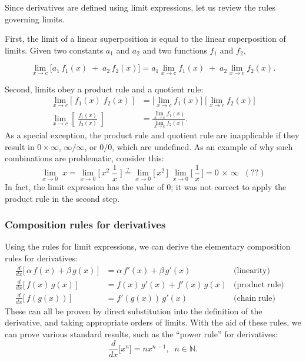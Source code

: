 \documentclass[10pt,a4paper]{article}
\begin{document}
Since derivatives are defined using limit expressions, let us review the
rules governing limits.

First, the limit of a linear superposition is equal to the linear
superposition of limits. Given two constants $a_1$ and $a_2$ and two
functions $f_1$ and $f_2$,

\begin{equation}
\lim_{x \rightarrow c} \big[a_1 \,f_1(x) \;+\; a_2\, f_2(x)\big] = a_1 \lim_{x \rightarrow c} f_1(x) \;+\; a_2 \lim_{x \rightarrow c} f_2(x).
\end{equation}

Second, limits obey a product rule and a quotient rule:
\begin{equation}
\begin{aligned}\lim_{x \rightarrow c} \big[\;f_1(x) \; f_2(x)\;\big] &= \Big[\lim_{x \rightarrow c} f_1(x)\Big]\;\Big[\lim_{x \rightarrow c} f_2(x)\Big]  \\ \lim_{x \rightarrow c} \left[\;\frac{f_1(x)}{f_2(x)}\;\right] &= \frac{\lim_{x \rightarrow c} f_1(x)}{\lim_{x \rightarrow c} f_2(x)}. \end{aligned}
\end{equation}
As a special exception, the product rule and quotient rule are
inapplicable if they result in $0 \times \infty$, $\infty/\infty$, or
$0/0$, which are undefined. As an example of why such combinations are
problematic, consider this:
\begin{equation}
\lim_{x \rightarrow 0} \;x = \lim_{x \rightarrow 0}\Big[\,x^2\;\frac{1}{x}\;\Big] \overset{?}{=} \lim_{x \rightarrow 0}\Big[\,x^2\,\Big]\; \lim_{x \rightarrow 0}\Big[\,\frac{1}{x}\,\Big] = 0 \, \times \, \infty \;\;(??)
\end{equation}
In fact, the limit expression has the value of 0; it was not correct
to apply the product rule in the second step.

\subsubsection{Composition rules for derivatives}
\label{composition-rules-for-derivatives}

Using the rules for limit expressions, we can derive the elementary
composition rules for derivatives:
\begin{align}
  \frac{d}{dx}\big[\,\alpha\, f(x) + \beta\, g(x)\,\big] &= \alpha\, f'(x) + \beta\, g'(x) \quad &\textrm{(linearity)}& \\
  \frac{d}{dx}\big[\,f(x) \, g(x)\,\big] &= f(x) \, g'(x) + f'(x) \, g(x) &\textrm{(product}\;\textrm{rule)}& \\
  \frac{d}{dx}\big[\,f(g(x))\,\big] &= f'(g(x)) \, g'(x) &\textrm{(chain}\;\textrm{rule)}&
\end{align}
These can all be proven by direct substitution into the definition of
the derivative, and taking appropriate orders of limits. With the aid of
these rules, we can prove various standard results, such as the ``power
rule'' for derivatives:
\begin{equation}
\frac{d}{dx} \big[x^n\big] = n x^{n-1}, \;\;n \in \mathbb{N}.
\end{equation}
\end{document}
